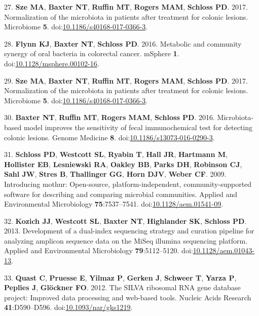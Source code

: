 \documentclass[11pt,]{article}
\begin{document}
\hypertarget{ref-normalization_Sze2017}{}
27. \textbf{Sze MA}, \textbf{Baxter NT}, \textbf{Ruffin MT},
\textbf{Rogers MAM}, \textbf{Schloss PD}. 2017. Normalization of the
microbiota in patients after treatment for colonic lesions. Microbiome
\textbf{5}.
doi:\href{https://doi.org/10.1186/s40168-017-0366-3}{10.1186/s40168-017-0366-3}.

\hypertarget{ref-Flynn2016}{}
28. \textbf{Flynn KJ}, \textbf{Baxter NT}, \textbf{Schloss PD}. 2016.
Metabolic and community synergy of oral bacteria in colorectal cancer.
mSphere \textbf{1}.
doi:\href{https://doi.org/10.1128/msphere.00102-16}{10.1128/msphere.00102-16}.

\hypertarget{ref-normalization_sze2017}{}
29. \textbf{Sze MA}, \textbf{Baxter NT}, \textbf{Ruffin MT},
\textbf{Rogers MAM}, \textbf{Schloss PD}. 2017. Normalization of the
microbiota in patients after treatment for colonic lesions. Microbiome
\textbf{5}.
doi:\href{https://doi.org/10.1186/s40168-017-0366-3}{10.1186/s40168-017-0366-3}.

\hypertarget{ref-crc_model_baxter2016}{}
30. \textbf{Baxter NT}, \textbf{Ruffin MT}, \textbf{Rogers MAM},
\textbf{Schloss PD}. 2016. Microbiota-based model improves the
sensitivity of fecal immunochemical test for detecting colonic lesions.
Genome Medicine \textbf{8}.
doi:\href{https://doi.org/10.1186/s13073-016-0290-3}{10.1186/s13073-016-0290-3}.

\hypertarget{ref-Schloss2009}{}
31. \textbf{Schloss PD}, \textbf{Westcott SL}, \textbf{Ryabin T},
\textbf{Hall JR}, \textbf{Hartmann M}, \textbf{Hollister EB},
\textbf{Lesniewski RA}, \textbf{Oakley BB}, \textbf{Parks DH},
\textbf{Robinson CJ}, \textbf{Sahl JW}, \textbf{Stres B},
\textbf{Thallinger GG}, \textbf{Horn DJV}, \textbf{Weber CF}. 2009.
Introducing mothur: Open-source, platform-independent,
community-supported software for describing and comparing microbial
communities. Applied and Environmental Microbiology
\textbf{75}:7537--7541.
doi:\href{https://doi.org/10.1128/aem.01541-09}{10.1128/aem.01541-09}.

\hypertarget{ref-Kozich2013}{}
32. \textbf{Kozich JJ}, \textbf{Westcott SL}, \textbf{Baxter NT},
\textbf{Highlander SK}, \textbf{Schloss PD}. 2013. Development of a
dual-index sequencing strategy and curation pipeline for analyzing
amplicon sequence data on the MiSeq illumina sequencing platform.
Applied and Environmental Microbiology \textbf{79}:5112--5120.
doi:\href{https://doi.org/10.1128/aem.01043-13}{10.1128/aem.01043-13}.

\hypertarget{ref-Quast2012}{}
33. \textbf{Quast C}, \textbf{Pruesse E}, \textbf{Yilmaz P},
\textbf{Gerken J}, \textbf{Schweer T}, \textbf{Yarza P}, \textbf{Peplies
J}, \textbf{Glöckner FO}. 2012. The SILVA ribosomal RNA gene database
project: Improved data processing and web-based tools. Nucleic Acids
Research \textbf{41}:D590--D596.
doi:\href{https://doi.org/10.1093/nar/gks1219}{10.1093/nar/gks1219}.
\end{document}
